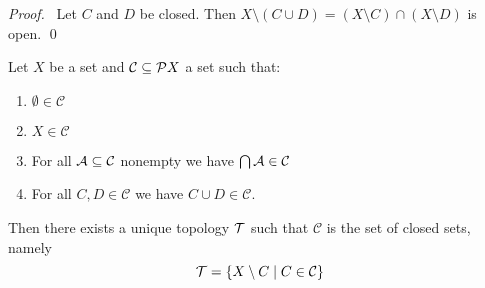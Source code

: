 \begin{proof}
    \pf\ Let $C$ and $D$ be closed. Then $X \setminus (C \cup D) = (X \setminus C) \cap (X \setminus D)$
    is open. \qed
\end{proof}

\begin{proposition}
    Let $X$ be a set and $\mathcal{C} \subseteq \pow X$ a set such that:
    \begin{enumerate}
        \item $\emptyset \in \mathcal{C}$
        \item $X \in \mathcal{C}$
        \item For all $\AA \subseteq \mathcal{C}$ nonempty we have $\bigcap \AA \in \mathcal{C}$
        \item For all $C, D \in \mathcal{C}$ we have $C \cup D \in \mathcal{C}$.
    \end{enumerate}
    Then there exists a unique topology $\TT$ such that $\mathcal{C}$ is the set of closed sets, namely
    \[ \TT = \{ X \setminus C \mid C \in \mathcal{C} \} \]
\end{proposition}

